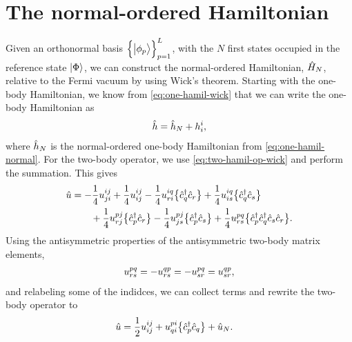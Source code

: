     \section{The normal-ordered Hamiltonian}
        \label{app:normal-ordered-hamiltonian}
        Given an orthonormal basis $\left\{ \ket{\phi_p} \right\}_{p = 1}^{L}$, with the
        $N$ first states occupied in the reference state $\ket{\Phi}$, we
        can construct the normal-ordered Hamiltonian, $\hat{H}_N$, relative to
        the Fermi vacuum by using Wick's theorem.
        Starting with the one-body Hamiltonian, we know from
        \autoref{eq:one-hamil-wick} that we can write the one-body Hamiltonian
        as
        \begin{align}
            \hat{h} = \hat{h}_N + h^{i}_{i},
        \end{align}
        where $\hat{h}_N$ is the normal-ordered one-body Hamiltonian from
        \autoref{eq:one-hamil-normal}.
        For the two-body operator, we use \autoref{eq:two-hamil-op-wick} and
        perform the summation.
        This gives
        \begin{align}
            \hat{u}
            &=
            - \frac{1}{4}u^{ij}_{ji}
            + \frac{1}{4}u^{ij}_{ij}
            - \frac{1}{4}u^{iq}_{ri}\bigl\{ 
                \hat{c}_{q}^{\dagger}
                \hat{c}_{r}
             \bigr\}
            + \frac{1}{4}u^{iq}_{is}\bigl\{ 
                \hat{c}_{q}^{\dagger}
                \hat{c}_{s}
             \bigr\}
            \nonumber \\
            &\qquad
            + \frac{1}{4}u^{pj}_{rj}\bigl\{ 
                \hat{c}_{p}^{\dagger}
                \hat{c}_{r}
             \bigr\}
            - \frac{1}{4}u^{pj}_{js}\bigl\{ 
                \hat{c}_{p}^{\dagger}
                \hat{c}_{s}
             \bigr\}
            + \frac{1}{4}u^{pq}_{rs}\bigl\{ 
                \hat{c}_{p}^{\dagger}
                \hat{c}_{q}^{\dagger}
                \hat{c}_{s}
                \hat{c}_{r}
             \bigr\}.
        \end{align}
        Using the antisymmetric properties of the antisymmetric two-body
        matrix elements,
        \begin{align}
            u^{pq}_{rs}
            =
            -u^{qp}_{rs}
            =
            -u^{pq}_{sr}
            =
            u^{qp}_{sr},
        \end{align}
        and relabeling some of the indidces, we can collect terms and rewrite
        the two-body operator to
        \begin{align}
            \hat{u}
            &=
            \frac{1}{2} u^{ij}_{ij}
            + u^{pi}_{qi}\bigl\{ 
                \hat{c}_{p}^{\dagger}
                \hat{c}_{q}
             \bigr\}
            + \hat{u}_N.
        \end{align}
